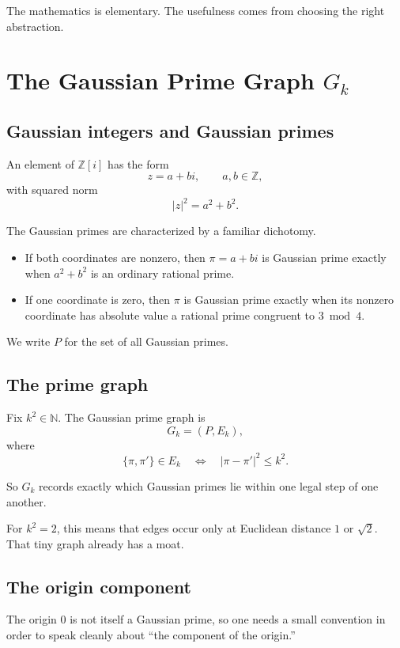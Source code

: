 \documentclass[12pt,letterpaper]{article}
\theoremstyle{definition}
\theoremstyle{remark}
\newcommand{\Zi}{\mathbb{Z}[i]}
\newcommand{\Gk}{G_k}
\newcommand{\Pk}{P}
\begin{document}
The mathematics is elementary. The usefulness comes from choosing the right abstraction.

\section{The Gaussian Prime Graph \texorpdfstring{$\Gk$}{Gk}}

\subsection{Gaussian integers and Gaussian primes}

An element of $\Zi$ has the form
\[
z=a+bi,\qquad a,b\in\mathbb{Z},
\]
with squared norm
\[
|z|^2=a^2+b^2.
\]

The Gaussian primes are characterized by a familiar dichotomy.

\begin{itemize}
\item If both coordinates are nonzero, then $\pi=a+bi$ is Gaussian prime exactly when $a^2+b^2$ is an ordinary rational prime.
\item If one coordinate is zero, then $\pi$ is Gaussian prime exactly when its nonzero coordinate has absolute value a rational prime congruent to $3 \bmod 4$.
\end{itemize}

We write $\Pk$ for the set of all Gaussian primes.

\subsection{The prime graph}

Fix $k^2\in\mathbb{N}$. The Gaussian prime graph is
\[
\Gk=(\Pk,E_k),
\]
where
\[
\{\pi,\pi'\}\in E_k
\quad\Longleftrightarrow\quad
|\pi-\pi'|^2\le k^2.
\]

So $\Gk$ records exactly which Gaussian primes lie within one legal step of one another.

For $k^2=2$, this means that edges occur only at Euclidean distance $1$ or $\sqrt{2}$. That tiny graph already has a moat.

\subsection{The origin component}

The origin $0$ is not itself a Gaussian prime, so one needs a small convention in order to speak cleanly about ``the component of the origin.''
\end{document}
